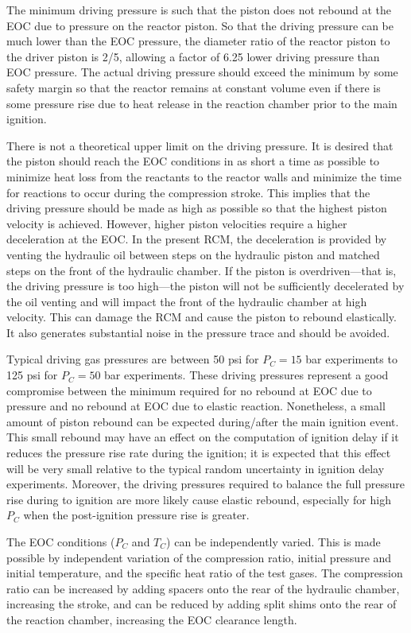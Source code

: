 \documentclass[12pt, letterpaper]{article}
\begin{document}
The minimum driving pressure is such that the piston does not rebound at
the EOC due to pressure on the reactor piston. So that the driving
pressure can be much lower than the EOC pressure, the diameter ratio of
the reactor piston to the driver piston is 2/5, allowing a factor of
6.25 lower driving pressure than EOC pressure. The actual driving
pressure should exceed the minimum by some safety margin so that the
reactor remains at constant volume even if there is some pressure rise
due to heat release in the reaction chamber prior to the main ignition.

There is not a theoretical upper limit on the driving pressure. It is desired that the piston should
reach the EOC conditions in as short a time as possible to minimize heat
loss from the reactants to the reactor walls and minimize the time for
reactions to occur during the compression stroke. This implies that the
driving pressure should be made as high as possible so that the highest
piston velocity is achieved. However, higher piston velocities require
a higher deceleration at the EOC. In the present RCM, the deceleration
is provided by venting the hydraulic oil between steps on the hydraulic
piston and matched steps on the front of the hydraulic chamber. If the
piston is overdriven---that is, the driving pressure is too high---the
piston will not be sufficiently decelerated by the oil venting and will
impact the front of the hydraulic chamber at high velocity. This can damage
the RCM and cause the piston to rebound elastically. It also generates
substantial noise in the pressure trace and should be avoided.

Typical driving gas pressures are between 50 psi for $P_C = 15$ bar experiments
to  125 psi for $P_C = 50$ bar experiments. These driving pressures represent a
good compromise between the minimum required for no rebound at EOC due
to pressure and no rebound at EOC due to elastic reaction. Nonetheless,
a small amount of piston rebound can be expected during/after the
main ignition event. This small rebound may have an effect on the computation of
ignition delay if it reduces the pressure rise rate during the ignition;
it is expected that this effect will be very small relative to the
typical random uncertainty in ignition delay experiments. Moreover,
the driving pressures required to balance the full pressure rise during
to ignition are more likely cause elastic rebound,
especially for high $P_C$ when the post-ignition pressure rise is greater.

The EOC conditions ($P_C$ and $T_C$) can be independently varied. This
is made possible by independent variation of the compression ratio,
initial pressure and initial temperature, and the specific heat ratio
of the test gases. The compression ratio can be
increased by adding spacers onto the rear of the hydraulic chamber,
increasing the stroke, and can be reduced by adding split shims onto
the rear of the reaction chamber, increasing the EOC clearance length.
\end{document}
